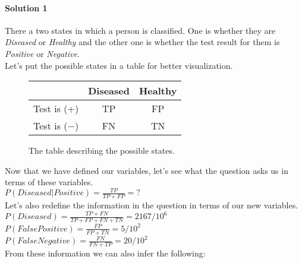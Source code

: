 \documentclass[12pt]{article}
\begin{document}
\paragraph{Solution 1}
There a two states in which a person is classified. 
One is whether they are \textit{Diseased} or \textit{Healthy} and the other 
one is whether the test result for them is \textit{Positive} or \textit{Negative}. \\

Let's put the possible states in a table for better visualization.
\newcommand\ddfrac[2]{\frac{\displaystyle #1}{\displaystyle #2}}




\begin{figure}[h]
    \centering
    \begin{center}
        \begin{tabular}{ |c|c|c|} 
         \hline
          & Diseased & Healthy \\ 
         \hline
         Test is (+) & TP & FP \\ 
         \hline
         Test is (\(-\)) & FN & TN \\ 
         \hline
        \end{tabular}
    \end{center}
    \caption{The table describing the possible states.}
    \label{table1}
\end{figure}


Now that we have defined our variables, 
let's see what the question asks us in terms of these variables. \\

$P(Diseased|Positive) = \ddfrac{TP}{TP + FP} = ?$ \\


Let's also redefine the information in the question in terms of our new variables. \\


\(P(Diseased) = \ddfrac{TP + FN}{TP + FP + FN + TN} = 2167/10^{6}\) \\

\(P(False Positive) = \ddfrac{FP}{FP + TN} = 5/10^{2}\) \\

\(P(False Negative) = \ddfrac{FN}{FN + TP} = 20/10^{2}\) \\

\pagebreak
From these information we can also infer the following: \\
\end{document}
